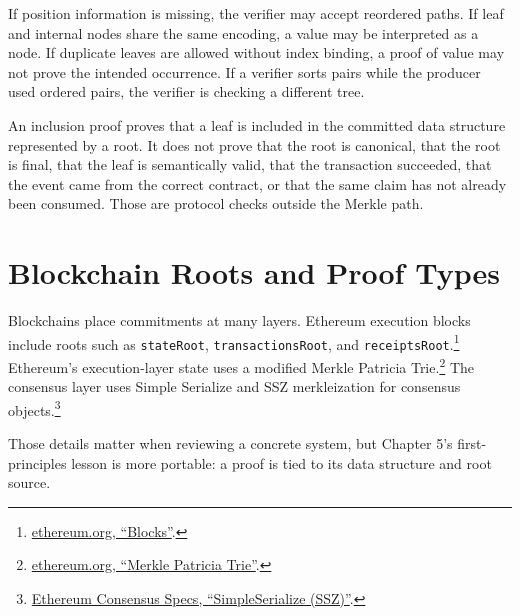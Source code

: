 If position information is missing, the verifier may accept reordered paths. If leaf and internal nodes share the same encoding, a value may be interpreted as a node. If duplicate leaves are allowed without index binding, a proof of value may not prove the intended occurrence. If a verifier sorts pairs while the producer used ordered pairs, the verifier is checking a different tree.

An inclusion proof proves that a leaf is included in the committed data structure represented by a root. It does not prove that the root is canonical, that the root is final, that the leaf is semantically valid, that the transaction succeeded, that the event came from the correct contract, or that the same claim has not already been consumed. Those are protocol checks outside the Merkle path.

\section{Blockchain Roots and Proof Types}

Blockchains place commitments at many layers. Ethereum execution blocks include roots such as \texttt{stateRoot}, \texttt{transactionsRoot}, and \texttt{receiptsRoot}.\footnote{\href{https://ethereum.org/developers/docs/blocks/}{ethereum.org, ``Blocks''}.} Ethereum's execution-layer state uses a modified Merkle Patricia Trie.\footnote{\href{https://ethereum.org/developers/docs/data-structures-and-encoding/patricia-merkle-trie/}{ethereum.org, ``Merkle Patricia Trie''}.} The consensus layer uses Simple Serialize and SSZ merkleization for consensus objects.\footnote{\href{https://ethereum.github.io/consensus-specs/ssz/simple-serialize/}{Ethereum Consensus Specs, ``SimpleSerialize (SSZ)''}.}

Those details matter when reviewing a concrete system, but Chapter 5's first-principles lesson is more portable: a proof is tied to its data structure and root source.

